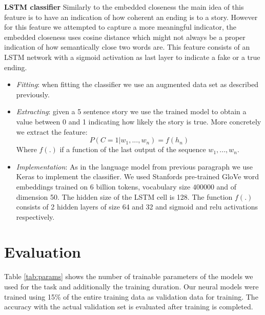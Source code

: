 \documentclass{article}
\begin{document}
\textbf{LSTM classifier} Similarly to the embedded closeness the main idea of this feature is to have an indication of how coherent an ending is to a story. However for this feature we attempted to capture a more meaningful indicator, the embedded closeness uses cosine distance which might not always be a proper indication of how semantically close two words are. This feature consists of an LSTM network with a sigmoid activation as last layer to indicate a fake or a true ending.
\begin{itemize}
	\item \textit{Fitting}: when fitting the classifier we use an augmented data set as described previously.
	\item \textit{Extracting}: given a 5 sentence story we use the trained model to obtain a value between 0 and 1 indicating how likely the story is true. More concretely we extract the feature:
	\begin{equation}
		P(C = 1| w_1,...,w_n) = f(h_n)
	\end{equation}
	Where $f(.)$ if a function of the last output of the sequence $w_1,...,w_n$.
	\item \textit{Implementation}: As in the language model from previous paragraph we use Keras to implement the classifier. We used Stanfords pre-trained GloVe word embeddings trained on 6 billion tokens, vocabulary size $400000$ and of dimension 50. The hidden size of the LSTM cell is 128. The function $f(.)$ consists of 2 hidden layers of size 64 and 32 and sigmoid and relu activations respectively.
\end{itemize}

\section{Evaluation}
\label{sec:training}


Table \ref{tab:params} shows the number of trainable parameters of the models we
used for the task and additionally the training duration. Our neural models were
trained using 15\% of the entire training data as validation data for training.
The accuracy with the actual validation set is evaluated after training is
completed. 
\end{document}

